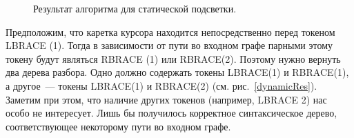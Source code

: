 \begin{figure}[t]
{    }
    \caption{Результат алгоритма для статической подсветки.}
    \label{staticRes}
\end{figure}

Предположим, что каретка курсора находится непосредственно перед токеном LBRACE (1). Тогда в зависимости от пути во входном графе парными этому токену будут являться RBRACE (1) или RBRACE(2). Поэтому нужно вернуть два дерева разбора. Одно должно содержать токены LBRACE(1) и RBRACE(1), а другое~--- токены LBRACE(1) и RBRACE(2) (см. рис.~\ref{dynamicRes}). Заметим при этом, что наличие других токенов (например, LBRACE 2) нас особо не интересует. Лишь бы получилось корректное синтаксическое дерево, соответствующее некоторому пути во входном графе.

\begin{figure}[t]
    \centering
    \qquad \qquad
    \subfloat[]{
}
\end{figure}
